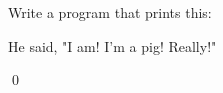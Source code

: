 Write a program that prints this:

\begin{console}

He said, "I am! I'm a pig! Really!"

\end{console}

\qed

